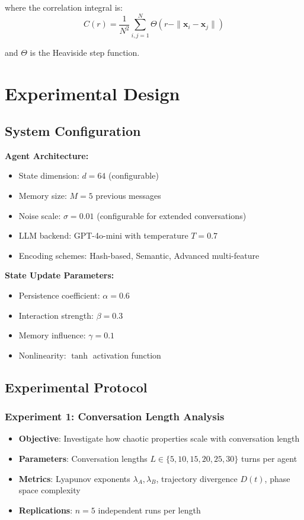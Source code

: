 \documentclass[11pt,a4paper]{article}
\begin{document}
where the correlation integral is:
\begin{equation}
C(r) = \frac{1}{N^2} \sum_{i,j=1}^{N} \Theta(r - \|\mathbf{x}_i - \mathbf{x}_j\|)
\end{equation}

and $\Theta$ is the Heaviside step function.

\section{Experimental Design}

\subsection{System Configuration}

\textbf{Agent Architecture:}
\begin{itemize}
    \item State dimension: $d = 64$ (configurable)
    \item Memory size: $M = 5$ previous messages
    \item Noise scale: $\sigma = 0.01$ (configurable for extended conversations)
    \item LLM backend: GPT-4o-mini with temperature $T = 0.7$
    \item Encoding schemes: Hash-based, Semantic, Advanced multi-feature
\end{itemize}

\textbf{State Update Parameters:}
\begin{itemize}
    \item Persistence coefficient: $\alpha = 0.6$
    \item Interaction strength: $\beta = 0.3$
    \item Memory influence: $\gamma = 0.1$
    \item Nonlinearity: $\tanh$ activation function
\end{itemize}

\subsection{Experimental Protocol}

\subsubsection{Experiment 1: Conversation Length Analysis}
\begin{itemize}
    \item \textbf{Objective}: Investigate how chaotic properties scale with conversation length
    \item \textbf{Parameters}: Conversation lengths $L \in \{5, 10, 15, 20, 25, 30\}$ turns per agent
    \item \textbf{Metrics}: Lyapunov exponents $\lambda_A, \lambda_B$, trajectory divergence $D(t)$, phase space complexity
    \item \textbf{Replications}: $n = 5$ independent runs per length
\end{itemize}
\end{document}
